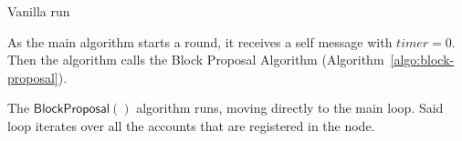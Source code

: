 \documentclass[10pt,a4paper]{article}
\begin{document}
\begin{section}{Vanilla run}
    
    
    As the main algorithm starts a round, it receives a self message with $timer=0$.
    Then the algorithm calls the Block Proposal Algorithm (Algorithm~\ref{algo:block-proposal}).
    
    
    
    The $\mathsf{BlockProposal}()$ algorithm runs, moving directly to the main loop. Said loop
    iterates over all the accounts that are registered in the node.
    

\end{section}
\end{document}
